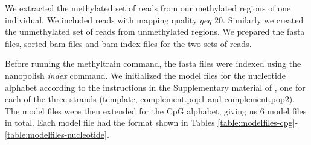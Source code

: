 We extracted the methylated set of reads from our methylated regions of one individual. We included reads with mapping quality $geq$ 20. Similarly we created the unmethylated set of reads from unmethylated regions. We prepared the fasta files, sorted bam files and bam index files for the two sets of reads. 

Before running the methyltrain command, the fasta files were indexed using the nanopolish \textit{index} command. We initialized the model files for the nucleotide alphabet according to the instructions in the Supplementary material of \cite{simpson2017detecting}, one for each of the three strands (template, complement.pop1 and complement.pop2). The model files were then extended for the CpG alphabet, giving us 6 model files in total. Each model file had the format shown in Tables \ref{table:modelfiles-cpg}-\ref{table:modelfiles-nucleotide}.

